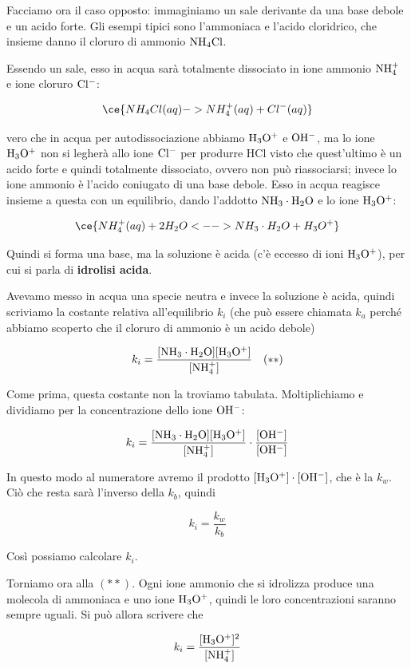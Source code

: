 \vspace{0.4cm}Facciamo ora il caso opposto: immaginiamo un sale derivante da una base debole e un acido forte. Gli esempi tipici sono l'ammoniaca e l'acido cloridrico, che insieme danno il cloruro di ammonio $\rm NH_4Cl$.

Essendo un sale, esso in acqua sarà totalmente dissociato in ione ammonio $\rm NH_4^+$ e ione cloruro $\rm Cl^-$:

$$\ce{NH_4Cl(aq) -> NH_4^+(aq) + Cl^-(aq)}$$

\E vero che in acqua per autodissociazione abbiamo $\rm H_3O^+$ e $\rm OH^-$, ma lo ione $\rm H_3O^+$ non si legherà allo ione $\rm Cl^-$ per produrre HCl visto che quest'ultimo è un acido forte e quindi totalmente dissociato, ovvero non può riassociarsi; invece lo ione ammonio è l'acido coniugato di una base debole. Esso in acqua reagisce insieme a questa con un equilibrio, dando l'addotto $\rm NH_3 \cdot H_2O$ e lo ione $\rm H_3O^+$:

$$\ce{NH_4^+(aq) + 2H_2O <--> NH_3 \cdot H_2O + H_3O^+}$$

Quindi si forma una base, ma la soluzione è acida (c'è eccesso di ioni $\rm H_3O^+$), per cui si parla di \textbf{idrolisi acida}.

Avevamo messo in acqua una specie neutra e invece la soluzione è acida, quindi scriviamo la costante relativa all'equilibrio $k_i$ (che può essere chiamata $k_a$ perché abbiamo scoperto che il cloruro di ammonio è un acido debole)

$$k_i=\rm \frac{[NH_3 \cdot H_2O][H_3O^+]}{[NH_4^+]} \quad (**)$$

Come prima, questa costante non la troviamo tabulata. Moltiplichiamo e dividiamo per la concentrazione dello ione $\rm OH^-$:

$$k_i=\rm \frac{[NH_3 \cdot H_2O][H_3O^+]}{[NH_4^+]} \cdot \frac{[OH^-]}{[OH^-]}$$

In questo modo al numeratore avremo il prodotto $\rm [H_3O^+] \cdot [OH^-]$, che è la $k_w$. Ciò che resta sarà l'inverso della $k_b$, quindi

$$k_i=\frac{k_w}{k_b}$$

Così possiamo calcolare $k_i$.

Torniamo ora alla $(**)$. Ogni ione ammonio che si idrolizza produce una molecola di ammoniaca e uno ione $\rm H_3O^+$, quindi le loro concentrazioni saranno sempre uguali. Si può allora scrivere che

$$k_i=\rm \frac{[H_3O^+]^2}{[NH_4^+]}$$


